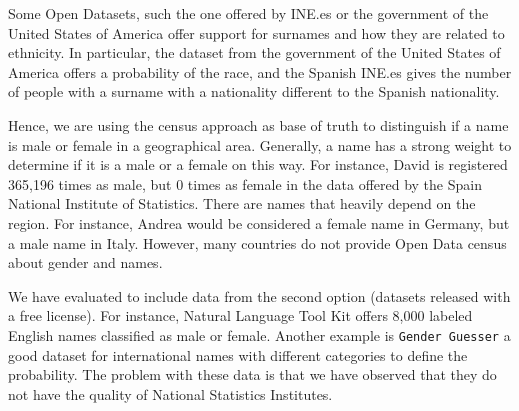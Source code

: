 \documentclass[a4paper]{article}
\begin{document}
Some Open Datasets, such the one offered by INE.es or the government of the United States of America offer support for surnames and how they are related to ethnicity. 
In particular, the dataset from the government of the United States of America offers a probability of the race, and the Spanish INE.es gives the number of people with a surname with a nationality different to the Spanish nationality.

Hence, we are using the census approach as base of truth to distinguish if a name is male or female in a geographical area. 
Generally, a name has a strong weight to determine if it is a male or a female on this way.
For instance, David is registered 365,196 times as male, but 0 times as female in the data offered by the Spain National Institute of Statistics.
There are names that heavily depend on the region. 
For instance, Andrea would be considered a female name in Germany, but a male name in Italy.
However, many countries do not provide Open Data census about gender and names.




We have evaluated to include data from the second option (datasets released with a free license). 
For instance, Natural Language Tool Kit offers 8,000 labeled English names classified as male or female. 
Another example is \texttt{Gender Guesser} a good dataset for international names with different categories to define the probability. 
The problem with these data is that we have observed that they do not have the quality of National Statistics Institutes. 

\end{document}

